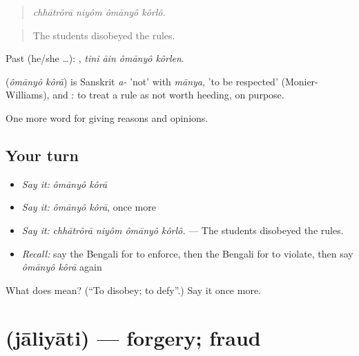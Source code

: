 \begin{quote}
   
\end{quote}

\begin{quote}
\emph{chhātrôrā niyôm ômānyô kôrlô.}
\end{quote}

\begin{quote}
The students disobeyed the rules.
\end{quote}

Past (he/she …):    , \emph{tini āin ômānyô kôrlen}.

\begin{cousinweb}
\textbf{ } (\emph{ômānyô kôrā}) is Sanskrit \emph{a-} 'not' with \emph{mānya}, 'to be respected' (Monier-Williams), and : to treat a rule as not worth heeding, on purpose.
\end{cousinweb}

\begin{grammarlens}[title={What you've built}]
One more word for giving reasons and opinions.
\end{grammarlens}

\subsection*{Your turn}
\begin{itemize}
\raggedright
  \item \emph{Say it:} \emph{ômānyô kôrā}
  \item \emph{Say it:} \emph{ômānyô kôrā}, once more
  \item \emph{Say it:} \emph{chhātrôrā niyôm ômānyô kôrlô.} — The students disobeyed the rules.
  \item \emph{Recall:} say the Bengali for to enforce, then the Bengali for to violate, then say \emph{ômānyô kôrā} again
\end{itemize}

\begin{tcolorbox}[breakable,colback=teal!4,colframe=teal!35!black,title={Before you move on}]
What does   mean? (\textquotedblleft{}To disobey; to defy\textquotedblright{}.) Say it once more.
\end{tcolorbox}
\section[\texorpdfstring{\bn{জালিয়াতি} (jāliyāti)}{জালিয়াতি (jāliyāti)}]{ (jāliyāti) — forgery; fraud}

